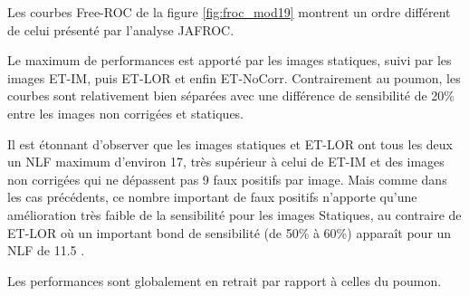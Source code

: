 Les courbes Free-ROC de la figure \ref{fig:froc_mod19} montrent un ordre différent de celui présenté par l'analyse JAFROC.

Le maximum de performances est apporté par les images statiques, suivi par les images ET-IM, puis ET-LOR et enfin ET-NoCorr. Contrairement au poumon, les courbes sont relativement bien séparées avec une différence de sensibilité de 20\% entre les images non corrigées et statiques. 

Il est étonnant d'observer que les images statiques et ET-LOR ont tous les deux un NLF maximum d'environ 17, très supérieur à celui de ET-IM et des images non corrigées qui ne dépassent pas 9 faux positifs par image. Mais comme dans les cas précédents, ce nombre important de faux positifs n'apporte qu'une amélioration très faible de la sensibilité pour les images Statiques, au contraire de ET-LOR où un important bond de sensibilité (de 50\% à 60\%) apparaît pour un NLF de 11.5 . 

Les performances sont globalement en retrait par rapport à celles du poumon. 







